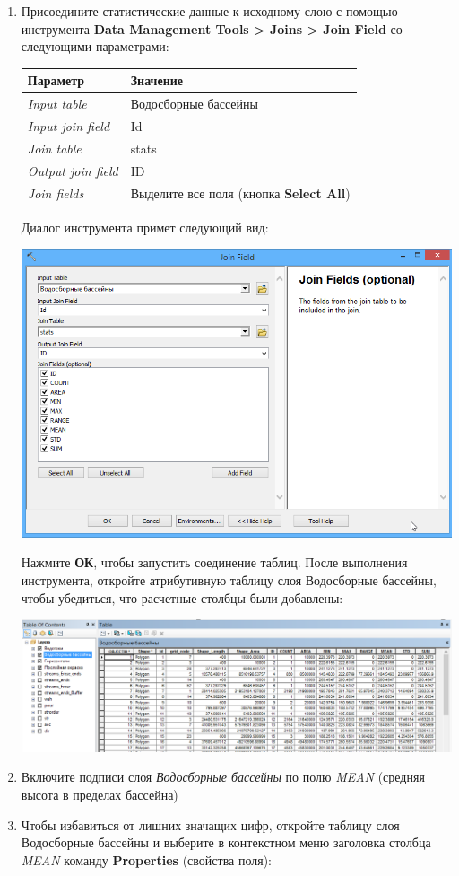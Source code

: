 \documentclass[]{book}
\theoremstyle{definition}
\theoremstyle{definition}
\theoremstyle{definition}
\theoremstyle{remark}
\begin{document}
\begin{enumerate}
\def\labelenumi{\arabic{enumi}.}
\item
  Присоедините статистические данные к исходному слою с помощью
  инструмента \textbf{Data Management Tools \textgreater{} Joins
  \textgreater{} Join Field} со следующими параметрами:

  \begin{longtable}[]{@{}ll@{}}
  \toprule
  Параметр & Значение\tabularnewline
  \midrule
  \endhead
  \emph{Input table} & Водосборные бассейны\tabularnewline
  \emph{Input join field} & Id\tabularnewline
  \emph{Join table} & stats\tabularnewline
  \emph{Output join field} & ID\tabularnewline
  \emph{Join fields} & Выделите все поля (кнопка \textbf{Select
  All})\tabularnewline
  \bottomrule
  \end{longtable}

  Диалог инструмента примет следующий вид:

  \includegraphics{images/Ex15/image27.png}

  Нажмите \textbf{ОК}, чтобы запустить соединение таблиц. После
  выполнения инструмента, откройте атрибутивную таблицу слоя Водосборные
  бассейны, чтобы убедиться, что расчетные столбцы были добавлены:

  \includegraphics{images/Ex15/image28.png}
\item
  Включите подписи слоя \emph{Водосборные бассейны} по полю \emph{MEAN}
  (средняя высота в пределах бассейна)
\item
  Чтобы избавиться от лишних значащих цифр, откройте таблицу слоя
  Водосборные бассейны и выберите в контекстном меню заголовка столбца
  \emph{MEAN} команду \textbf{Properties} (свойства поля):


\end{enumerate}
\end{document}
